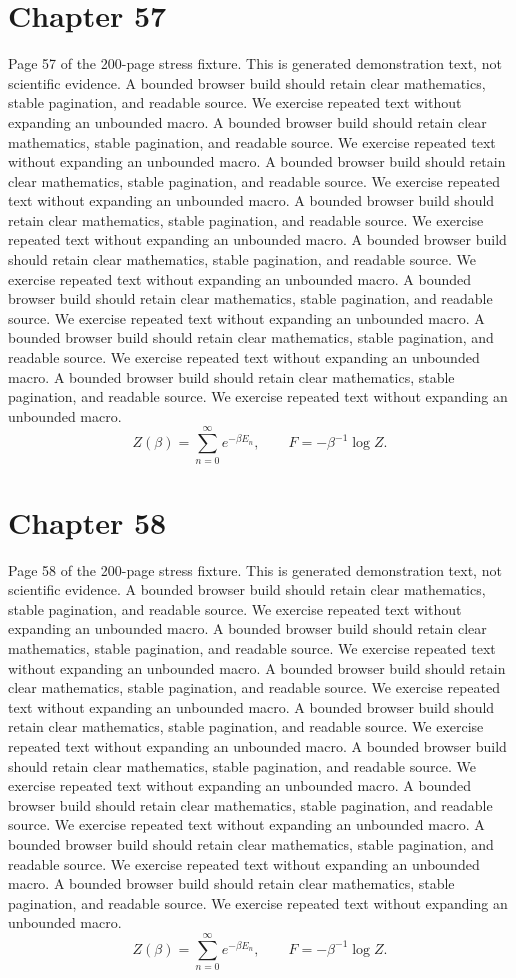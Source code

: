 \documentclass[11pt]{article}
\begin{document}
\section*{Chapter 57}
Page 57 of the 200-page stress fixture. This is generated demonstration text, not scientific evidence.
A bounded browser build should retain clear mathematics, stable pagination, and readable source. We exercise repeated text without expanding an unbounded macro.
A bounded browser build should retain clear mathematics, stable pagination, and readable source. We exercise repeated text without expanding an unbounded macro.
A bounded browser build should retain clear mathematics, stable pagination, and readable source. We exercise repeated text without expanding an unbounded macro.
A bounded browser build should retain clear mathematics, stable pagination, and readable source. We exercise repeated text without expanding an unbounded macro.
A bounded browser build should retain clear mathematics, stable pagination, and readable source. We exercise repeated text without expanding an unbounded macro.
A bounded browser build should retain clear mathematics, stable pagination, and readable source. We exercise repeated text without expanding an unbounded macro.
A bounded browser build should retain clear mathematics, stable pagination, and readable source. We exercise repeated text without expanding an unbounded macro.
A bounded browser build should retain clear mathematics, stable pagination, and readable source. We exercise repeated text without expanding an unbounded macro.
\[Z(\beta)=\sum_{n=0}^{\infty}e^{-\beta E_n},\qquad F=-\beta^{-1}\log Z.\]
\newpage
\section*{Chapter 58}
Page 58 of the 200-page stress fixture. This is generated demonstration text, not scientific evidence.
A bounded browser build should retain clear mathematics, stable pagination, and readable source. We exercise repeated text without expanding an unbounded macro.
A bounded browser build should retain clear mathematics, stable pagination, and readable source. We exercise repeated text without expanding an unbounded macro.
A bounded browser build should retain clear mathematics, stable pagination, and readable source. We exercise repeated text without expanding an unbounded macro.
A bounded browser build should retain clear mathematics, stable pagination, and readable source. We exercise repeated text without expanding an unbounded macro.
A bounded browser build should retain clear mathematics, stable pagination, and readable source. We exercise repeated text without expanding an unbounded macro.
A bounded browser build should retain clear mathematics, stable pagination, and readable source. We exercise repeated text without expanding an unbounded macro.
A bounded browser build should retain clear mathematics, stable pagination, and readable source. We exercise repeated text without expanding an unbounded macro.
A bounded browser build should retain clear mathematics, stable pagination, and readable source. We exercise repeated text without expanding an unbounded macro.
\[Z(\beta)=\sum_{n=0}^{\infty}e^{-\beta E_n},\qquad F=-\beta^{-1}\log Z.\]
\newpage
\end{document}
